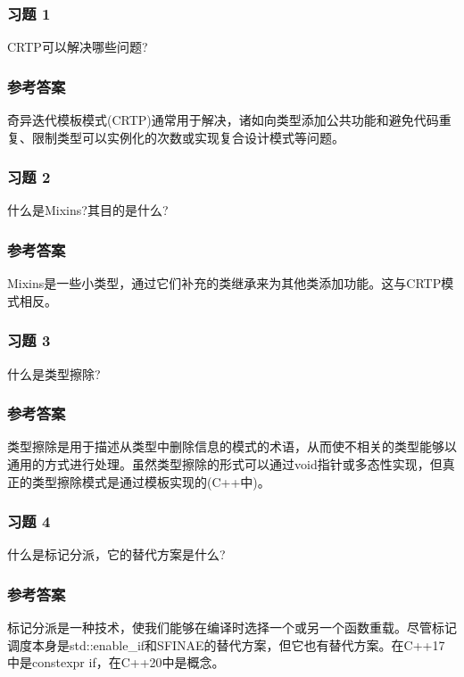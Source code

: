 \subsubsection{习题 1}

CRTP可以解决哪些问题?

\subsubsection{参考答案}

奇异迭代模板模式(CRTP)通常用于解决，诸如向类型添加公共功能和避免代码重复、限制类型可以实例化的次数或实现复合设计模式等问题。


\subsubsection{习题 2}

什么是Mixins?其目的是什么?

\subsubsection{参考答案}

Mixins是一些小类型，通过它们补充的类继承来为其他类添加功能。这与CRTP模式相反。

\subsubsection{习题 3}

什么是类型擦除?

\subsubsection{参考答案}

类型擦除是用于描述从类型中删除信息的模式的术语，从而使不相关的类型能够以通用的方式进行处理。虽然类型擦除的形式可以通过void指针或多态性实现，但真正的类型擦除模式是通过模板实现的(C++中)。

\subsubsection{习题 4}

什么是标记分派，它的替代方案是什么?

\subsubsection{参考答案}

标记分派是一种技术，使我们能够在编译时选择一个或另一个函数重载。尽管标记调度本身是std::enable\_if和SFINAE的替代方案，但它也有替代方案。在C++17中是constexpr if，在C++20中是概念。

